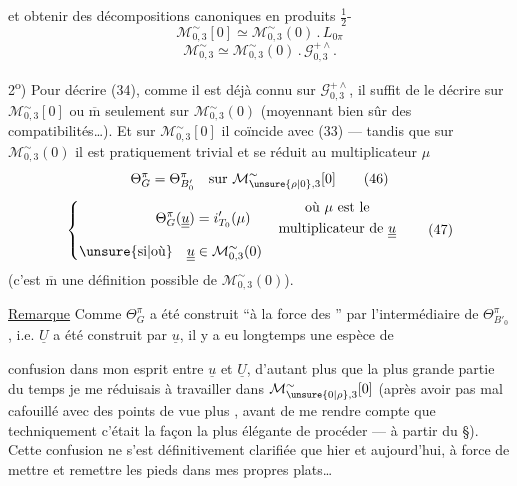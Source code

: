 

et obtenir des décompositions canoniques en produits
$\tfrac12$-
\[
\mathcal M_{0,3}^{\sim}[0]\simeq\mathcal M_{0,3}^{\sim}(0)\mathbin{.}L_{0\pi}
\tag{44}
\]
\[
\mathcal M_{0,3}^{\sim}\simeq\mathcal M_{0,3}^{\sim}(0)\mathbin{.}\mathcal G_{0,3}^{+\wedge}.
\tag{45}
\]

2\textsuperscript{o}) Pour décrire (34), comme il est déjà connu sur
$\mathcal G_{0,3}^{+\wedge}$, il suffit de le décrire sur
$\mathcal M_{0,3}^{\sim}[0]$ ou $\overline{\mathrm m}$ seulement sur
$\mathcal M_{0,3}^{\sim}(0)$ (moyennant bien sûr des compatibilités\ldots).
Et sur $\mathcal M_{0,3}^{\sim}[0]$ il coïncide avec (33) ---
tandis que sur $\mathcal M_{0,3}^{\sim}(0)$ il est pratiquement trivial
et se réduit au multiplicateur $\mu$
\[
\Theta_G^{\pi}=\Theta_{B'_0}^{\pi}
\quad\text{sur }\mathcal M_{\unsure{\rho|0},3}^{\sim}[0]
\tag{46}
\]
\[
\left\{\begin{aligned}
\Theta_G^{\pi}(\underline{\underline u})
  &=i'_{T_0}(\mu)
  \qquad\begin{gathered}\text{où }\mu\text{ est le}\\
  \text{multiplicateur de }\underline{\underline u}\end{gathered}\\
\text{\unsure{si|où}}\quad
\underline{\underline u}&\in\mathcal M_{0,3}^{\sim}(0)
\end{aligned}\right.
\tag{47}
\]
(c'est $\overline{\mathrm m}$ une définition possible de $\mathcal M_{0,3}^{\sim}(0)$).

\uline{Remarque} Comme $\Theta_G^{\pi}$ a été construit
``à la force des '' par l'intermédiaire
de $\Theta_{B'_0}^{\pi}$, i.e. $\underline U$ a été construit par $\underline u$,
il y a eu longtemps une espèce de



confusion dans mon esprit entre $\underline u$ et $\underline U$,
d'autant plus que la plus grande partie du temps je me réduisais à travailler
dans $\mathcal M_{\unsure{0|\rho},3}^{\sim}[0]$
(après avoir pas mal cafouillé avec des points de vue plus
, avant de me rendre compte que techniquement c'était
la façon la plus élégante de procéder --- à partir du \S{}).
Cette confusion ne s'est définitivement clarifiée que hier et aujourd'hui,
à force de mettre et remettre les pieds dans mes propres plats\ldots

